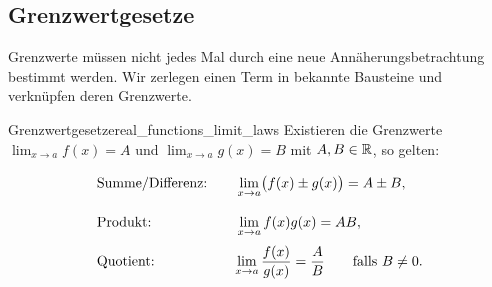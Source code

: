 \subsection{Grenzwertgesetze}
\label{subsec:real_functions_limit_laws}
Grenzwerte müssen nicht jedes Mal durch eine neue Annäherungsbetrachtung
bestimmt werden. Wir zerlegen einen Term in bekannte Bausteine und
verknüpfen deren Grenzwerte.
\begin{TheoremBox}{Grenzwertgesetze}{real_functions_limit_laws}
  Existieren die Grenzwerte $\lim_{x\to a}f(x)=A$ und
  $\lim_{x\to a}g(x)=B$ mit $A,B\in\mathbb{R}$, so gelten:
  \[
    \begin{array}{l@{\qquad}l}
      \text{Summe/Differenz:}&
        \displaystyle\vphantom{\lim_{x\to a}\frac{f(x)}{g(x)}=\frac AB}
        \lim_{x\to a}\bigl(f(x)\pm g(x)\bigr)=A\pm B,\\[1em]
      \text{Produkt:}&
        \displaystyle\vphantom{\lim_{x\to a}\frac{f(x)}{g(x)}=\frac AB}
        \lim_{x\to a}f(x)g(x)=AB,\\[1em]
      \text{Quotient:}&
        \displaystyle\lim_{x\to a}\frac{f(x)}{g(x)}=\frac AB
        \qquad\text{falls }B\ne0.
    \end{array}
  \]
\end{TheoremBox}
